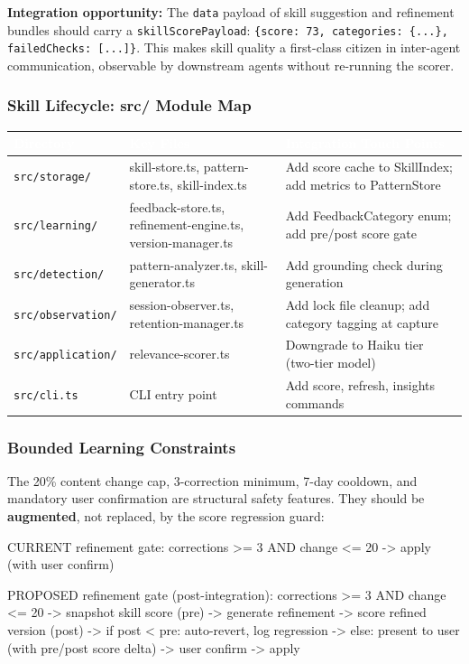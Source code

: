 \documentclass[11pt,letterpaper]{article}
\newcommand{\tableheader}[1]{\textbf{\sffamily\textcolor{white}{#1}}}
\begin{document}
\textbf{Integration opportunity:} The \texttt{data} payload of skill suggestion and refinement bundles should carry a \texttt{skillScorePayload}: \texttt{\{score: 73, categories: \{...\}, failedChecks: [...]\}}. This makes skill quality a first-class citizen in inter-agent communication, observable by downstream agents without re-running the scorer.

\subsubsection{Skill Lifecycle: src/ Module Map}

\begin{center}
\begin{tabularx}{\textwidth}{L{3.5cm}L{3.5cm}X}
\toprule
{}
\tableheader{Directory} & \tableheader{Key Files} & \tableheader{Integration Touch Points} \\
\midrule
\texttt{src/storage/} & skill-store.ts, pattern-store.ts, skill-index.ts & Add score cache to SkillIndex; add metrics to PatternStore \\
\texttt{src/learning/} & feedback-store.ts, refinement-engine.ts, version-manager.ts & Add FeedbackCategory enum; add pre/post score gate \\
\texttt{src/detection/} & pattern-analyzer.ts, skill-generator.ts & Add grounding check during generation \\
\texttt{src/observation/} & session-observer.ts, retention-manager.ts & Add lock file cleanup; add category tagging at capture \\
\texttt{src/application/} & relevance-scorer.ts & Downgrade to Haiku tier (two-tier model) \\
\texttt{src/cli.ts} & CLI entry point & Add score, refresh, insights commands \\
\bottomrule
\end{tabularx}
\end{center}

\subsubsection{Bounded Learning Constraints}

The 20\% content change cap, 3-correction minimum, 7-day cooldown, and mandatory user confirmation are structural safety features. They should be \textbf{augmented}, not replaced, by the score regression guard:

\begin{asciibox}
  CURRENT refinement gate:
    corrections >= 3 AND change <= 20%
    -> apply (with user confirm)

  PROPOSED refinement gate (post-integration):
    corrections >= 3 AND change <= 20%
    -> snapshot skill score (pre)
    -> generate refinement
    -> score refined version (post)
    -> if post < pre: auto-revert, log regression
    -> else: present to user (with pre/post score delta)
    -> user confirm -> apply
\end{asciibox}
\end{document}
